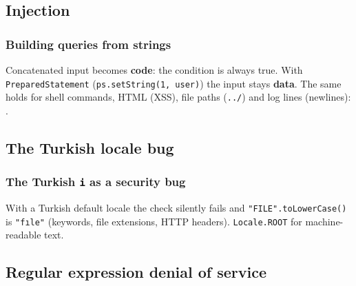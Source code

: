 \documentclass[aspectratio=169,10pt,compress]{beamer}
\begin{document}
\subsection[Injection]{Injection}




\begin{frame}[t,fragile] \frametitle{Building queries from strings}

  \small Concatenated input becomes \textbf{code}: the condition is always true. With \texttt{PreparedStatement}
  (\texttt{ps.setString(1, user)}) the input stays \textbf{data}. The same holds for shell commands, HTML (XSS),
  file paths (\texttt{../}) and log lines (newlines): .
\end{frame}

\subsection[Locale]{The Turkish locale bug}




\begin{frame}[t,fragile] \frametitle{The Turkish \texttt{i} as a security bug}

  \vspace{0.3em}
  \small With a Turkish default locale the check silently fails and \texttt{"FILE".toLowerCase()} is \texttt{"fıle"}
  (keywords, file extensions, HTTP headers).  \texttt{Locale.ROOT} for machine-readable text.
\end{frame}

\subsection[ReDoS]{Regular expression denial of service}
\end{document}
